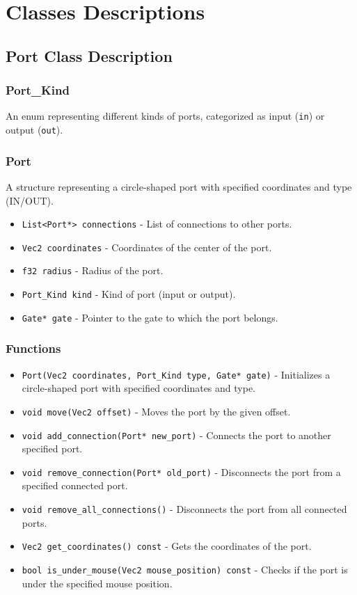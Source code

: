 \documentclass{article}
\begin{document}
\section*{Classes Descriptions}

\subsection*{Port Class Description}

\subsubsection*{Port\_Kind}
An enum representing different kinds of ports, categorized as input (\texttt{in}) or output (\texttt{out}).

\subsubsection*{Port}
A structure representing a circle-shaped port with specified coordinates and type (IN/OUT).

\begin{itemize}
    \item \texttt{List<Port*> connections} - List of connections to other ports.
    \item \texttt{Vec2 coordinates} - Coordinates of the center of the port.
    \item \texttt{f32 radius} - Radius of the port.
    \item \texttt{Port\_Kind kind} - Kind of port (input or output).
    \item \texttt{Gate* gate} - Pointer to the gate to which the port belongs.
\end{itemize}

\subsubsection*{Functions}

\begin{itemize}
    \item \texttt{Port(Vec2 coordinates, Port\_Kind type, Gate* gate)} - Initializes a circle-shaped port with specified coordinates and type.
    \item \texttt{void move(Vec2 offset)} - Moves the port by the given offset.
    \item \texttt{void add\_connection(Port* new\_port)} - Connects the port to another specified port.
    \item \texttt{void remove\_connection(Port* old\_port)} - Disconnects the port from a specified connected port.
    \item \texttt{void remove\_all\_connections()} - Disconnects the port from all connected ports.
    \item \texttt{Vec2 get\_coordinates() const} - Gets the coordinates of the port.
    \item \texttt{bool is\_under\_mouse(Vec2 mouse\_position) const} - Checks if the port is under the specified mouse position.
\end{itemize}
\end{document}
